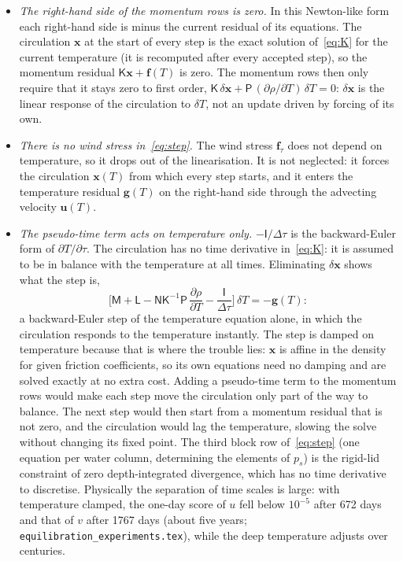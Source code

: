 \documentclass{article}
\begin{document}
\begin{itemize}
\item \emph{The right-hand side of the momentum rows is zero.} In this Newton-like form each right-hand side is minus the current residual of its equations. The circulation $\mathbf{x}$ at the start of every step is the exact solution of~\eqref{eq:K} for the current temperature (it is recomputed after every accepted step), so the momentum residual $\mathsf{K}\mathbf{x} + \mathbf{f}(T)$ is zero. The momentum rows then only require that it stays zero to first order, $\mathsf{K}\,\delta\mathbf{x} + \mathsf{P}\,(\partial\rho/\partial T)\,\delta T = 0$: $\delta\mathbf{x}$ is the linear response of the circulation to $\delta T$, not an update driven by forcing of its own.
\item \emph{There is no wind stress in~\eqref{eq:step}.} The wind stress $\mathbf{f}_\tau$ does not depend on temperature, so it drops out of the linearisation. It is not neglected: it forces the circulation $\mathbf{x}(T)$ from which every step starts, and it enters the temperature residual $\mathbf{g}(T)$ on the right-hand side through the advecting velocity $\mathbf{u}(T)$.
\item \emph{The pseudo-time term acts on temperature only.} $-\mathsf{I}/\Delta\tau$ is the backward-Euler form of $\partial T/\partial\tau$. The circulation has no time derivative in~\eqref{eq:K}: it is assumed to be in balance with the temperature at all times. Eliminating $\delta\mathbf{x}$ shows what the step is,
\[
\Big[\mathsf{M} + \mathsf{L} - \mathsf{N}\mathsf{K}^{-1}\mathsf{P}\,\frac{\partial\rho}{\partial T} - \frac{\mathsf{I}}{\Delta\tau}\Big]\,\delta T = -\mathbf{g}(T):
\]
a backward-Euler step of the temperature equation alone, in which the circulation responds to the temperature instantly. The step is damped on temperature because that is where the trouble lies: $\mathbf{x}$ is affine in the density for given friction coefficients, so its own equations need no damping and are solved exactly at no extra cost. Adding a pseudo-time term to the momentum rows would make each step move the circulation only part of the way to balance. The next step would then start from a momentum residual that is not zero, and the circulation would lag the temperature, slowing the solve without changing its fixed point. The third block row of~\eqref{eq:step} (one equation per water column, determining the elements of $p_s$) is the rigid-lid constraint of zero depth-integrated divergence, which has no time derivative to discretise. Physically the separation of time scales is large: with temperature clamped, the one-day score of $u$ fell below $10^{-5}$ after 672 days and that of $v$ after 1767 days (about five years; \texttt{equilibration\_experiments.tex}), while the deep temperature adjusts over centuries.
\end{itemize}
\end{document}
